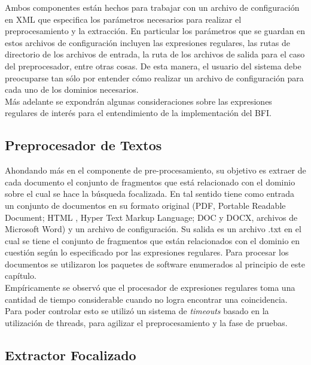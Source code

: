 Ambos componentes están hechos para trabajar con un archivo de configuración en XML que especifica los parámetros necesarios para realizar el preprocesamiento y la extracción. En particular los parámetros que se guardan en estos archivos de configuración incluyen las expresiones regulares, las rutas de directorio de los archivos de entrada, la ruta de los archivos de salida para el caso del preprocesador, entre otras cosas. De esta manera, el usuario del sistema debe preocuparse tan sólo por entender cómo realizar un archivo de configuración para cada uno de los dominios necesarios. \\

Más adelante se expondrán algunas consideraciones sobre las expresiones regulares de interés para el entendimiento de la implementación del BFI. \\

\subsection{Preprocesador de Textos}\label{sect:implementacion-preProcesador}

Ahondando más en el componente de pre-procesamiento, su objetivo es extraer de cada documento el conjunto de fragmentos que está relacionado con el dominio sobre el cual se hace la búsqueda focalizada. En tal sentido tiene como entrada un conjunto de documentos en su formato original (PDF, Portable Readable Document; HTML , Hyper Text Markup Language; DOC y DOCX, archivos de Microsoft Word) y un archivo de configuración. Su salida es un archivo .txt en el cual se tiene el conjunto de fragmentos que están relacionados con el dominio en cuestión según lo especificado por las expresiones regulares. Para procesar los documentos se utilizaron los paquetes de software enumerados al principio de este capítulo. \\

Empíricamente se observó que el procesador de expresiones regulares toma una cantidad de tiempo considerable cuando no logra encontrar una coincidencia. Para poder controlar esto se utilizó un sistema de \emph{timeouts} basado en la utilización de threads, para agilizar el preprocesamiento y la fase de pruebas. \\

\subsection{Extractor Focalizado}\label{sect:implementacion-extractorFocalizado}

